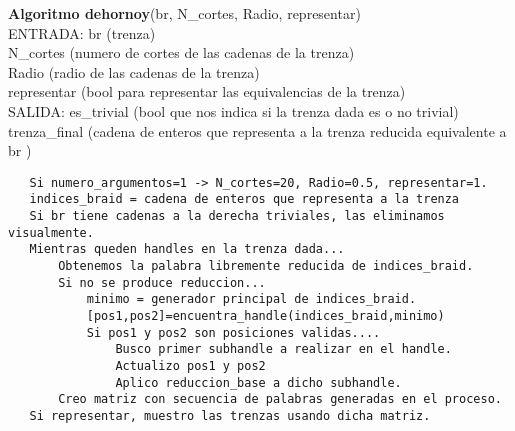 \newpage
\begin{alg}
	\textbf{Algoritmo dehornoy}(br, N\_cortes, Radio, representar)\\
	ENTRADA: br (trenza)\\
	\hspace*{2.2cm} N\_cortes (numero de cortes de las cadenas de la trenza)\\
	\hspace*{2.2cm} Radio (radio de las cadenas de la trenza)\\
	\hspace*{2.2cm} representar (bool para representar las equivalencias de la trenza)\\
	SALIDA: \hspace{0.4cm} es\_trivial (bool que nos indica si la trenza dada es o no trivial) \\
	\hspace*{2.2cm} trenza\_final (cadena de enteros que representa a la trenza reducida equivalente a br )
	
\begin{lstlisting}
   Si numero_argumentos=1 -> N_cortes=20, Radio=0.5, representar=1.
   indices_braid = cadena de enteros que representa a la trenza
   Si br tiene cadenas a la derecha triviales, las eliminamos visualmente.
   Mientras queden handles en la trenza dada...
	   Obtenemos la palabra libremente reducida de indices_braid.
	   Si no se produce reduccion...
		   minimo = generador principal de indices_braid.
		   [pos1,pos2]=encuentra_handle(indices_braid,minimo)
		   Si pos1 y pos2 son posiciones validas....
			   Busco primer subhandle a realizar en el handle.
			   Actualizo pos1 y pos2
			   Aplico reduccion_base a dicho subhandle.
	   Creo matriz con secuencia de palabras generadas en el proceso.
   Si representar, muestro las trenzas usando dicha matriz.
			   
			   
		
		   
			   
\end{lstlisting}
\end{alg}

